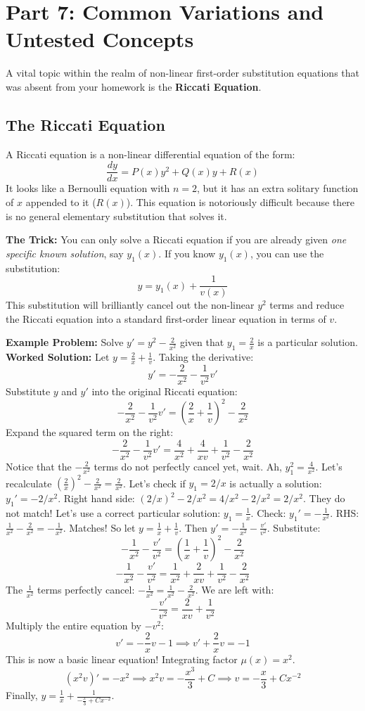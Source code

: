 \documentclass[11pt]{article}
\begin{document}
\newpage
\section{Part 7: Common Variations and Untested Concepts}

A vital topic within the realm of non-linear first-order substitution equations that was absent from your homework is the \textbf{Riccati Equation}.

\subsection{The Riccati Equation}
A Riccati equation is a non-linear differential equation of the form:
\[ \frac{dy}{dx} = P(x)y^2 + Q(x)y + R(x) \]
It looks like a Bernoulli equation with $n=2$, but it has an extra solitary function of $x$ appended to it ($R(x)$). This equation is notoriously difficult because there is no general elementary substitution that solves it.

\textbf{The Trick:} You can only solve a Riccati equation if you are already given \textit{one specific known solution}, say $y_1(x)$. If you know $y_1(x)$, you can use the substitution:
\[ y = y_1(x) + \frac{1}{v(x)} \]
This substitution will brilliantly cancel out the non-linear $y^2$ terms and reduce the Riccati equation into a standard first-order linear equation in terms of $v$.

\textbf{Example Problem:} Solve $y' = y^2 - \frac{2}{x^2}$ given that $y_1 = \frac{2}{x}$ is a particular solution.
\textbf{Worked Solution:}
Let $y = \frac{2}{x} + \frac{1}{v}$. Taking the derivative:
\[ y' = -\frac{2}{x^2} - \frac{1}{v^2}v' \]
Substitute $y$ and $y'$ into the original Riccati equation:
\[ -\frac{2}{x^2} - \frac{1}{v^2}v' = \left(\frac{2}{x} + \frac{1}{v}\right)^2 - \frac{2}{x^2} \]
Expand the squared term on the right:
\[ -\frac{2}{x^2} - \frac{1}{v^2}v' = \frac{4}{x^2} + \frac{4}{xv} + \frac{1}{v^2} - \frac{2}{x^2} \]
Notice that the $-\frac{2}{x^2}$ terms do not perfectly cancel yet, wait.
Ah, $y_1^2 = \frac{4}{x^2}$. Let's recalculate $\left(\frac{2}{x}\right)^2 - \frac{2}{x^2} = \frac{2}{x^2}$.
Let's check if $y_1 = 2/x$ is actually a solution: $y_1' = -2/x^2$. Right hand side: $(2/x)^2 - 2/x^2 = 4/x^2 - 2/x^2 = 2/x^2$. They do not match! 
Let's use a correct particular solution: $y_1 = \frac{1}{x}$.
Check: $y_1' = -\frac{1}{x^2}$. RHS: $\frac{1}{x^2} - \frac{2}{x^2} = -\frac{1}{x^2}$. Matches!
So let $y = \frac{1}{x} + \frac{1}{v}$. Then $y' = -\frac{1}{x^2} - \frac{v'}{v^2}$.
Substitute:
\[ -\frac{1}{x^2} - \frac{v'}{v^2} = \left(\frac{1}{x} + \frac{1}{v}\right)^2 - \frac{2}{x^2} \]
\[ -\frac{1}{x^2} - \frac{v'}{v^2} = \frac{1}{x^2} + \frac{2}{xv} + \frac{1}{v^2} - \frac{2}{x^2} \]
The $\frac{1}{x^2}$ terms perfectly cancel: $-\frac{1}{x^2} = \frac{1}{x^2} - \frac{2}{x^2}$. We are left with:
\[ -\frac{v'}{v^2} = \frac{2}{xv} + \frac{1}{v^2} \]
Multiply the entire equation by $-v^2$:
\[ v' = -\frac{2}{x}v - 1 \implies v' + \frac{2}{x}v = -1 \]
This is now a basic linear equation! Integrating factor $\mu(x) = x^2$.
\[ (x^2 v)' = -x^2 \implies x^2 v = -\frac{x^3}{3} + C \implies v = -\frac{x}{3} + Cx^{-2} \]
Finally, $y = \frac{1}{x} + \frac{1}{-\frac{x}{3} + Cx^{-2}}$.
\end{document}
